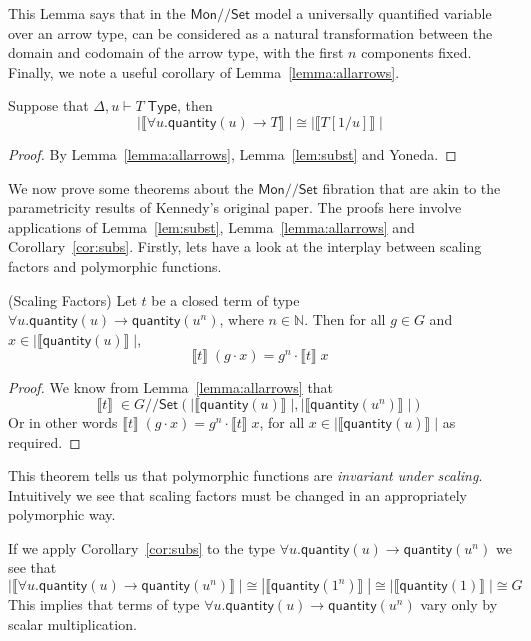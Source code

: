 \documentclass[a4paper,UKenglish]{lipics}
\newcommand{\msf}[1]{\mathsf{#1}} %
\newcommand{\Mon}{\msf{Mon}}
\newcommand{\Set}{\msf{Set}}
\newcommand{\GroupSet}[1]{#1/\!/\Set}
\newcommand{\MonSet}{\GroupSet{\Mon}}
\newcommand{\GSet}{\GroupSet{G}}
\newcommand{\sem}[1]{\ensuremath{\llbracket #1 \rrbracket} \;}
\newcommand{\qnt}{\msf{quantity}}
\begin{document}
This Lemma says that in the $\MonSet$ model a universally quantified variable over an arrow type, can be considered as a natural transformation between the domain and codomain of the arrow type, with the first $n$ components fixed. Finally, we note a useful corollary of Lemma~\ref{lemma:allarrows}.
\begin{corollary}
\label{cor:subs}
Suppose that $\Delta, u \vdash T \; \msf{ Type}$, then
 \[
  |\sem{\forall u . \qnt(u) \rightarrow T}| \cong |\sem{T[1/u]}|
\]
\end{corollary}
\begin{proof}
 By Lemma~\ref{lemma:allarrows}, Lemma~\ref{lem:subst} and Yoneda.
\end{proof}



We now prove some theorems about the $\MonSet$ fibration that are akin to the parametricity results of Kennedy's original paper. The proofs here involve applications of Lemma~\ref{lem:subst}, Lemma~\ref{lemma:allarrows} and Corollary~\ref{cor:subs}. Firstly, lets have a look at the interplay between scaling factors and polymorphic functions.

\begin{theorem}(Scaling Factors)
\label{thm:ScalFact}
Let $t$ be a closed term of type $\forall u. \qnt(u) \rightarrow \qnt(u^n)$, where $n\in \mathbb{N}$. Then for all $g \in G$ and $x \in |\sem{\qnt(u)}|$,
\[
\sem{t} (g \cdot x) = g^n \cdot \sem{t} x
\]
\end{theorem}
\begin{proof}
We know from Lemma~\ref{lemma:allarrows} that
\[
\sem{t} \in \GSet(|\sem{\qnt(u)}|,|\sem{\qnt(u^n)}|)
\]
Or in other words $\sem{t} (g \cdot x) = g^n \cdot \sem{t} x$, for all $x \in |\sem{\qnt(u)}|$ as required.
\end{proof}
This theorem tells us that polymorphic functions are \emph{invariant under scaling}. Intuitively we see that scaling factors must be changed in an appropriately polymorphic way.

If we apply Corollary~\ref{cor:subs} to the type $\forall u. \qnt(u)\rightarrow \qnt(u^n)$ we see that
\[
 |\sem{\forall u. \qnt(u)\rightarrow \qnt(u^n)}| \cong |\sem{\qnt(1^n)}| \cong |\sem{\qnt(1)}| \cong G
\]
This implies that terms of type $\forall u. \qnt(u)\rightarrow \qnt(u^n)$ vary only by scalar multiplication.
\end{document}
